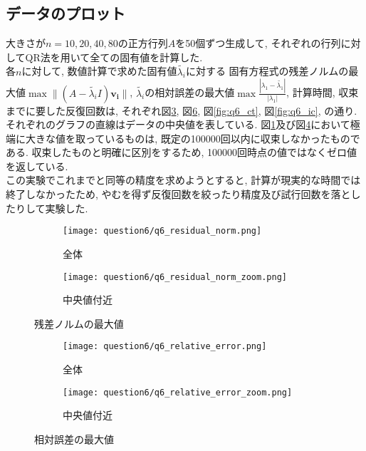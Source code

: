 \documentclass[uplatex,a4j]{jsarticle}
\begin{document}
\subsection{データのプロット}
\label{sec:q6_1}
大きさが$n = 10,20,40,80$の正方行列$A$を50個ずつ生成して, 
それぞれの行列に対してQR法を用いて全ての固有値を計算した. \\
各$n$に対して, 数値計算で求めた固有値$\tilde{\lambda_i}$に対する
固有方程式の残差ノルムの最大値$\max{\| (A - \tilde{\lambda_i}I) \bm{v_i} \| }$, 
$\tilde{\lambda_i}$の相対誤差の最大値$\max{\frac{|\lambda_1 - \tilde{\lambda_1}|}{|\lambda_1|}}$, 
計算時間, 収束までに要した反復回数は, 
それぞれ図\ref{fig:q6_rn}, 図\ref{fig:q6_re}, 図\ref{fig:q6_ct}, 図\ref{fig:q6_ic}, の通り. 
それぞれのグラフの直線はデータの中央値を表している. 
図\ref{fig:q6_rn_whole}及び図\ref{fig:q6_re_whole}において極端に大きな値を取っているものは, 
既定の100000回以内に収束しなかったものである. 
収束したものと明確に区別をするため, 100000回時点の値ではなくゼロ値を返している. \\
この実験でこれまでと同等の精度を求めようとすると, 計算が現実的な時間では終了しなかったため, 
やむを得ず反復回数を絞ったり精度及び試行回数を落としたりして実験した. 


\begin{figure}[htbp]
  \centering

  \begin{subfigure}{0.45\textwidth}
    \centering
    \texttt{[image: question6/q6\_residual\_norm.png]}
    \caption{全体}
    \label{fig:q6_rn_whole}
  \end{subfigure}
  \hfill
  \begin{subfigure}{0.45\textwidth}
    \centering
    \texttt{[image: question6/q6\_residual\_norm\_zoom.png]}
    \caption{中央値付近}
    \label{fig:q6_rn_zoom}
  \end{subfigure}
  
  \caption{残差ノルムの最大値}
  \label{fig:q6_rn}
\end{figure}


\begin{figure}[htbp]
  \centering

  \begin{subfigure}{0.45\textwidth}
    \centering
    \texttt{[image: question6/q6\_relative\_error.png]}
    \caption{全体}
    \label{fig:q6_re_whole}
  \end{subfigure}
  \hfill
  \begin{subfigure}{0.45\textwidth}
    \centering
    \texttt{[image: question6/q6\_relative\_error\_zoom.png]}
    \caption{中央値付近}
    \label{fig:q6_re_zoom}
  \end{subfigure}
  
  \caption{相対誤差の最大値}
  \label{fig:q6_re}
\end{figure}
\end{document}

